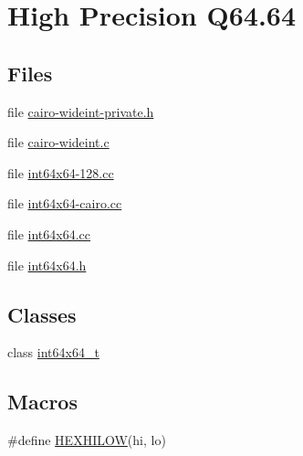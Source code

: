 \hypertarget{group__highprec}{}\section{High Precision Q64.64}
\label{group__highprec}
\subsection*{Files}
\begin{DoxyCompactItemize}
\item 
file \hyperlink{cairo-wideint-private_8h}{cairo-\/wideint-\/private.\+h}
\item 
file \hyperlink{cairo-wideint_8c}{cairo-\/wideint.\+c}
\item 
file \hyperlink{int64x64-128_8cc}{int64x64-\/128.\+cc}
\item 
file \hyperlink{int64x64-cairo_8cc}{int64x64-\/cairo.\+cc}
\item 
file \hyperlink{int64x64_8cc}{int64x64.\+cc}
\item 
file \hyperlink{int64x64_8h}{int64x64.\+h}
\end{DoxyCompactItemize}
\subsection*{Classes}
\begin{DoxyCompactItemize}
\item 
class \hyperlink{classint64x64__t}{int64x64\+\_\+t}
\end{DoxyCompactItemize}
\subsection*{Macros}
\begin{DoxyCompactItemize}
\item 
\#define \hyperlink{group__highprec_gab4ef18031edb07b2d7cb6197583f3c51}{H\+E\+X\+H\+I\+L\+OW}(hi,  lo)
\end{DoxyCompactItemize}
